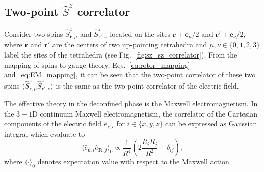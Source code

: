 \documentclass[twocolumn,superscriptaddress,amsmath,amssymb,aps,prx,nofootinbib]{revtex4-2}
\begin{document}
\subsection{Two-point $\hat{S}^z$ correlator} \label{sec:sz_sz_correlator}

Consider  two spins $\hat{S}^z_{\mathbf{r},\mu}$ and $\hat{S}^z_{\mathbf{r}',\nu}$ located on the sites $\mathbf{r} + \mathbf{e}_\mu/2$ and $\mathbf{r}' + \mathbf{e}_\nu/2$, where $\mathbf{r}$ and $\mathbf{r}'$ are the centers of two up-pointing tetrahedra and $\mu, \nu \in \{ 0,1,2,3 \}$ label the sites of the tetrahedra (see Fig.~\ref{fig:sz_sz_correlator}). From the mapping of spins to gauge theory, Eqs.~\eqref{eq:rotor_mapping} and~\eqref{eq:EM_mapping}, it can be seen that the two-point  correlator of these two spins $\langle \hat{S}^z_{\mathbf{r},\mu} \hat{S}^z_{\mathbf{r}',\nu}\rangle $ is the same as the two-point correlator of the electric field.


The effective theory in the deconfined phase is the Maxwell electromagnetism. In the $3+1$D continuum Maxwell electromagnetism, the correlator of the Cartesian components of the electric field $\hat{e}_{\mathbf{r},i}$ for $i \in \{ x,y,z \}$ can be expressed as Gaussian integral which evaluate to~\cite{hermele2004}
\begin{equation}\label{eq:maxwellEE}
  \langle \hat{e}_{\boldsymbol{0},i} \hat{e}_{\mathbf{R},j} \rangle_0 \propto \frac{1}{R^4} \left( 2 \frac{R_i R_j}{R^2} - \delta_{ij} \right) ,
\end{equation}
where 
$\langle \cdot \rangle_0$ denotes expectation value with respect to the Maxwell action. 
\end{document}
